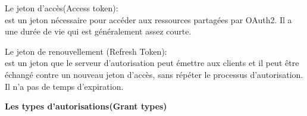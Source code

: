 \begin{list}{•}
	\item Le jeton d’accès(Access token):\\
	 est un jeton nécessaire pour accéder aux ressources partagées par
	OAuth2. Il a une durée de vie qui est généralement assez courte.
	\item  
	\item Le jeton de renouvellement (Refresh Token):\\
	 est un jeton que le serveur d’autorisation peut émettre aux clients et il peut être échangé contre un nouveau jeton d’accès, sans répéter le processus d’autorisation. Il n’a pas de temps d’expiration.
\end{list}

\textbf{Les types d’autorisations(Grant types)}


